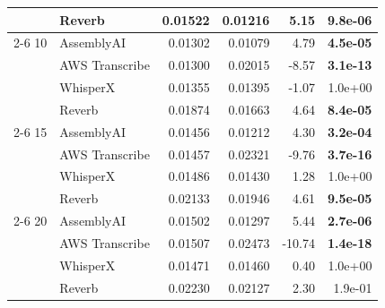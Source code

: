\begin{tabular}{llrrrr}
  & Reverb & 0.01522 & 0.01216 & 5.15 & \textbf{ 9.8e-06} \\
\cmidrule(r){2-6}
10 & AssemblyAI & 0.01302 & 0.01079 & 4.79 & \textbf{ 4.5e-05} \\
  & AWS Transcribe & 0.01300 & 0.02015 & -8.57 & \textbf{ 3.1e-13} \\
  & WhisperX & 0.01355 & 0.01395 & -1.07 &  1.0e+00 \\
  & Reverb & 0.01874 & 0.01663 & 4.64 & \textbf{ 8.4e-05} \\
\cmidrule(r){2-6}
15 & AssemblyAI & 0.01456 & 0.01212 & 4.30 & \textbf{ 3.2e-04} \\
  & AWS Transcribe & 0.01457 & 0.02321 & -9.76 & \textbf{ 3.7e-16} \\
  & WhisperX & 0.01486 & 0.01430 & 1.28 &  1.0e+00 \\
  & Reverb & 0.02133 & 0.01946 & 4.61 & \textbf{ 9.5e-05} \\
\cmidrule(r){2-6}
20 & AssemblyAI & 0.01502 & 0.01297 & 5.44 & \textbf{ 2.7e-06} \\
  & AWS Transcribe & 0.01507 & 0.02473 & -10.74 & \textbf{ 1.4e-18} \\
  & WhisperX & 0.01471 & 0.01460 & 0.40 &  1.0e+00 \\
  & Reverb & 0.02230 & 0.02127 & 2.30 &  1.9e-01 \\
\bottomrule
\end{tabular}
